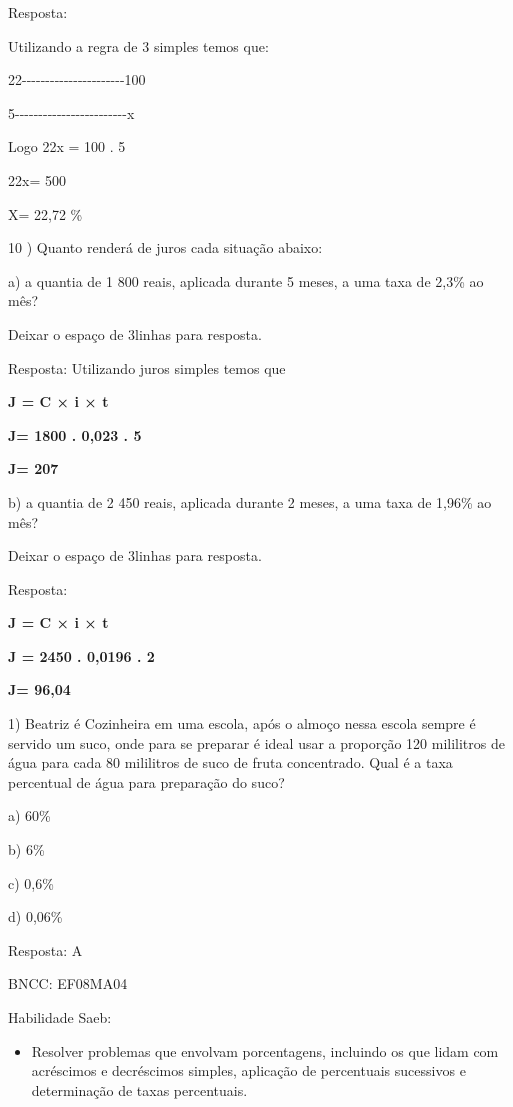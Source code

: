 {Resposta:

Utilizando a regra de 3 simples temos que:

22-\/-\/-\/-\/-\/-\/-\/-\/-\/-\/-\/-\/-\/-\/-\/-\/-\/-\/-\/-\/-\/-100

5-\/-\/-\/-\/-\/-\/-\/-\/-\/-\/-\/-\/-\/-\/-\/-\/-\/-\/-\/-\/-\/-\/-\/-x

Logo 22x = 100 . 5

22x= 500

X= 22,72 \%

10 ) Quanto renderá de juros cada situação abaixo:

a) a quantia de 1 800 reais, aplicada durante 5 meses, a uma taxa de
2,3\% ao mês?

Deixar o espaço de 3linhas para resposta.

Resposta: Utilizando juros simples temos que

\textbf{J = C × i × t}

\textbf{J= 1800 . 0,023 . 5}

\textbf{J= 207}

b) a quantia de 2 450 reais, aplicada durante 2 meses, a uma taxa de
1,96\% ao mês?

Deixar o espaço de 3linhas para resposta.

Resposta:

\textbf{J = C × i × t}

\textbf{J = 2450 . 0,0196 . 2}

\textbf{J= 96,04}


1) Beatriz é Cozinheira em uma escola, após o almoço nessa escola sempre
é servido um suco, onde para se preparar é ideal usar a proporção 120
mililitros de água para cada 80 mililitros de suco de fruta concentrado.
Qual é a taxa percentual de água para preparação do suco?

a) 60\%

b) 6\%

c) 0,6\%

d) 0,06\%

Resposta: A

BNCC: EF08MA04

Habilidade Saeb:

\begin{itemize}
\tightlist
\item
  Resolver problemas que envolvam porcentagens, incluindo os que lidam
  com acréscimos e decréscimos simples, aplicação de percentuais
  sucessivos e determinação de taxas percentuais.
\end{itemize}

}
